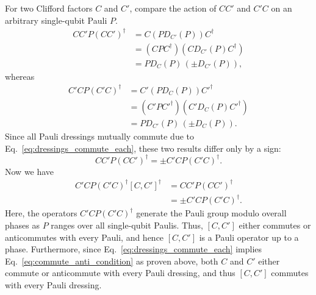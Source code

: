 \documentclass[
 reprint,
 amsmath,amssymb,
 pra,superscriptaddress, nofootinbib
]{revtex4-2}
\theoremstyle{definition}
\theoremstyle{plain}
\begin{document}
For two Clifford factors $C$ and $C'$, compare the action of $CC'$ and $C'C$ on an arbitrary single-qubit Pauli $P$.
\begin{align}
  CC'P(CC')^\dagger &=C(P D_{C'}(P))C^\dagger  \\
  &=(CPC^\dagger) (CD_{C'}(P)C^\dagger)\\
  &=P D_C(P)\,(\pm D_{C'}(P)),
\end{align}
whereas
\begin{align}
  C'CP(C'C)^\dagger&=C'(P D_C(P))C'^\dagger  \\
    &=(C'PC'^\dagger)(C' D_C(P)C'^\dagger) \\
  &=P D_{C'}(P)\,(\pm D_C(P)).
\end{align}
Since all Pauli dressings mutually commute due to Eq.~\eqref{eq:dressings_commute_each}, these two results differ only by a sign:
\begin{equation}
    CC'P(CC')^\dagger=\pm C'CP(C'C)^\dagger.
\end{equation}
Now we have
\begin{align}
    [C,C']C'CP(C'C)^\dagger[C,C']^\dagger&=CC'P(CC')^\dagger\\
    &=\pm C'CP(C'C)^\dagger.
\end{align}
Here, the operators $C'CP(C'C)^\dagger$ generate the Pauli group modulo overall phases as $P$ ranges over all single-qubit Paulis.
Thus, $[C,C']$ either commutes or anticommutes with every Pauli, and hence $[C,C']$ is a Pauli operator up to a phase.
Furthermore, since Eq.~\eqref{eq:dressings_commute_each} implies Eq.~\eqref{eq:commute_anti_condition} as proven above, both $C$ and $C'$ either commute or anticommute with every Pauli dressing, and thus $[C,C']$ commutes with every Pauli dressing. 
\end{document}
